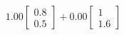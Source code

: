 \documentclass[preview]{standalone}
\begin{document}
\begin{align*}
1.00 \begin{bmatrix} 0.8 \\ 0.5 \end{bmatrix} + 0.00 \begin{bmatrix} 1 \\ 1.6 \end{bmatrix}
\end{align*}
\end{document}
